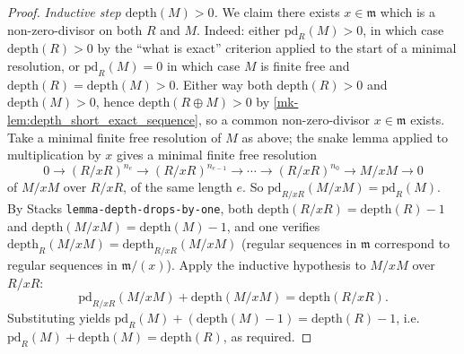 \begin{proof}
  \emph{Inductive step \(\text{depth}(M) > 0\).} We claim there exists \(x \in \mathfrak{m}\)
  which is a non-zero-divisor on both \(R\) and \(M\). Indeed: either \(\text{pd}_R(M) > 0\), in
  which case \(\text{depth}(R) > 0\) by the ``what is exact'' criterion applied to the start
  of a minimal resolution, or \(\text{pd}_R(M) = 0\) in which case \(M\) is finite free and
  \(\text{depth}(R) = \text{depth}(M) > 0\). Either way both \(\text{depth}(R) > 0\) and
  \(\text{depth}(M) > 0\), hence \(\text{depth}(R \oplus M) > 0\) by
  \ref{mk-lem:depth_short_exact_sequence}, so a common non-zero-divisor \(x \in
  \mathfrak{m}\) exists. Take a minimal finite free resolution of \(M\) as above; the snake
  lemma applied to multiplication by \(x\) gives a minimal finite free resolution
  \[
    0 \to (R/xR)^{n_e} \to (R/xR)^{n_{e-1}} \to \cdots \to (R/xR)^{n_0} \to M/xM \to 0
  \]
  of \(M/xM\) over \(R/xR\), of the same length \(e\). So
  \(\text{pd}_{R/xR}(M/xM) = \text{pd}_R(M)\). By Stacks
  \texttt{lemma-depth-drops-by-one}, both \(\text{depth}(R/xR) = \text{depth}(R) - 1\) and
  \(\text{depth}(M/xM) = \text{depth}(M) - 1\), and one verifies
  \(\text{depth}_R(M/xM) = \text{depth}_{R/xR}(M/xM)\) (regular sequences in \(\mathfrak{m}\)
  correspond to regular sequences in \(\mathfrak{m}/(x)\)). Apply the inductive hypothesis to
  \(M/xM\) over \(R/xR\):
  \[
    \text{pd}_{R/xR}(M/xM) + \text{depth}(M/xM) = \text{depth}(R/xR).
  \]
  Substituting yields
  \(\text{pd}_R(M) + (\text{depth}(M) - 1) = \text{depth}(R) - 1\), i.e.\
  \(\text{pd}_R(M) + \text{depth}(M) = \text{depth}(R)\), as required.
\end{proof}

